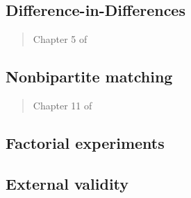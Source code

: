 \documentclass[12pt]{article}
\begin{document}
\begin{verse}  \end{verse}


\subsection{Difference-in-Differences}

\begin{verse} Chapter 5 of  \end{verse}

\begin{verse}  \end{verse}

\subsection{Nonbipartite matching}

\begin{verse} Chapter 11 of  \end{verse}

\begin{verse}  \end{verse}

\subsection{Factorial experiments}

\begin{verse}  \end{verse}

\begin{verse}  \end{verse}

\subsection{External validity}

\begin{verse}  \end{verse}

\begin{verse}  \end{verse}
\end{document}
